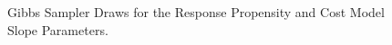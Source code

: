 \documentclass[12pt]{article}
\makeatletter
\def\fixFloatSize#1{}%
\makeatother
\begin{document}
\begin{appendices}
\bgroup
\fixFloatSize{images/GibbsRespCost.png}
\begin{figure}[!htbp]
\centering \makeatletter{}
\makeatother 
\caption{{Gibbs Sampler Draws for the Response Propensity and Cost Model Slope Parameters.}}
\label{fig-gibbs-response-cost}
\end{figure}
\egroup


\end{appendices}
\end{document}
